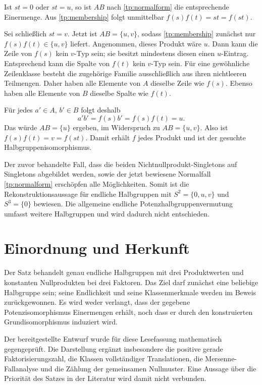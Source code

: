\documentclass[a4paper,11pt]{article}
\theoremstyle{remark}
\begin{document}
Ist $st=0$ oder $st=u$, so ist $AB$ nach
\eqref{tp:normalform} die entsprechende Einermenge. Aus
\eqref{tp:membership} folgt unmittelbar
$f(s)f(t)=st=f(st)$.

Sei schließlich $st=v$. Jetzt ist $AB=\{u,v\}$, sodass
\eqref{tp:membership} zunächst nur $f(s)f(t)\in\{u,v\}$ liefert.
Angenommen, dieses Produkt wäre $u$. Dann kann die Zeile von $f(s)$
kein $v$-Typ sein; sie besitzt mindestens diesen einen $u$-Eintrag.
Entsprechend kann die Spalte von $f(t)$ kein $v$-Typ sein. Für eine
gewöhnliche Zeilenklasse besteht die zugehörige Familie ausschließlich
aus ihren nichtleeren Teilmengen. Daher haben alle Elemente von $A$
dieselbe Zeile wie $f(s)$. Ebenso haben alle Elemente von $B$ dieselbe
Spalte wie $f(t)$.

Für jedes $a'\in A$, $b'\in B$ folgt deshalb
\[
 a'b'=f(s)b'=f(s)f(t)=u.
\]
Das würde $AB=\{u\}$ ergeben, im Widerspruch zu
$AB=\{u,v\}$. Also ist $f(s)f(t)=v=f(st)$. Damit erhält $f$ jedes
Produkt und ist der gesuchte Halbgruppenisomorphismus.

Der zuvor behandelte Fall, dass die beiden Nichtnullprodukt-Singletons
auf Singletons abgebildet werden, sowie der jetzt bewiesene Normalfall
\eqref{tp:normalform} erschöpfen alle Möglichkeiten. Somit ist die
Rekonstruktionsaussage für endliche Halbgruppen mit
$S^2=\{0,u,v\}$ und $S^3=\{0\}$ bewiesen. Die allgemeine endliche
Potenzhalbgruppenvermutung umfasst weitere Halbgruppen und wird dadurch
nicht entschieden.


\section*{Einordnung und Herkunft}

Der Satz behandelt genau endliche Halbgruppen mit drei Produktwerten und
konstanten Nullprodukten bei drei Faktoren. Das Ziel darf zunächst eine
beliebige Halbgruppe sein; seine Endlichkeit und seine Klassenmerkmale
werden im Beweis zurückgewonnen. Es wird weder verlangt, dass der gegebene
Potenzisomorphismus Einermengen erhält, noch dass er durch den konstruierten
Grundisomorphismus induziert wird.

Der bereitgestellte Entwurf wurde für diese Lesefassung mathematisch
gegengeprüft. Die Darstellung ergänzt insbesondere die positive gerade
Faktorisierungszahl, die Klassen vollständiger Translationen, die
Mersenne-Fallanalyse und die Zählung der gemeinsamen Nullmuster.
Eine Aussage über die Priorität des Satzes in der Literatur wird damit
nicht verbunden.
\end{document}
